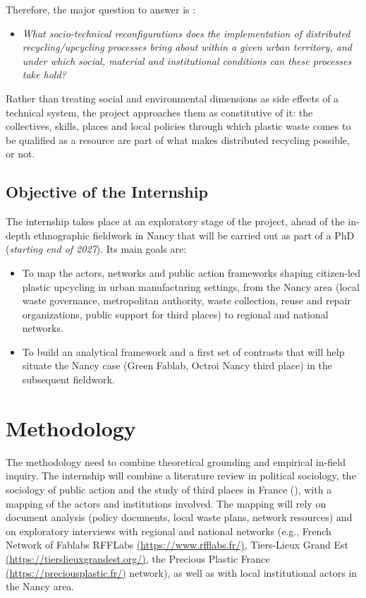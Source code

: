 \documentclass[
  english,
  11pt,
]{article}
\providecommand{\tightlist}{%
  \setlength{\itemsep}{0pt}\setlength{\parskip}{0pt}}
\begin{document}
Therefore, the major question to answer is :

\begin{itemize}
\tightlist
\item
  \emph{What socio-technical reconfigurations does the implementation of
  distributed recycling/upcycling processes bring about within a given
  urban territory, and under which social, material and institutional
  conditions can these processes take hold?}
\end{itemize}

Rather than treating social and environmental dimensions as side effects
of a technical system, the project approaches them as constitutive of
it: the collectives, skills, places and local policies through which
plastic waste comes to be qualified as a resource are part of what makes
distributed recycling possible, or not.

\subsection{Objective of the
Internship}\label{objective-of-the-internship}

The internship takes place at an exploratory stage of the project, ahead
of the in-depth ethnographic fieldwork in Nancy that will be carried out
as part of a PhD (\emph{starting end of 2027}). Its main goals are:

\begin{itemize}
\tightlist
\item
  To map the actors, networks and public action frameworks shaping
  citizen-led plastic upcycling in urban manufacturing settings, from
  the Nancy area (local waste governance, metropolitan authority, waste
  collection, reuse and repair organizations, public support for third
  places) to regional and national networks.
\item
  To build an analytical framework and a first set of contrasts that
  will help situate the Nancy case (Green Fablab, Octroi Nancy third
  place) in the subsequent fieldwork.
\end{itemize}

\section{Methodology}\label{methodology}

The methodology need to combine theoretical grounding and empirical
in-field inquiry. The internship will combine a literature review in
political sociology, the sociology of public action and the study of
third places in France (), with a mapping of the actors and institutions involved. The
mapping will rely on document analysis (policy documents, local waste
plans, network resources) and on exploratory interviews with regional
and national networks (e.g., French Network of Fablabs RFFLabs
\href{https://www.rfflabs.fr/}{(https://www.rfflabs.fr/)}, Tiers-Lieux
Grand Est
\href{https://tierslieuxgrandest.org/}{(https://tierslieuxgrandest.org/)},
the Precious Plastic France
\href{https://preciousplastic.fr/}{(https://preciousplastic.fr/)}
network), as well as with local institutional actors in the Nancy area.
\end{document}
